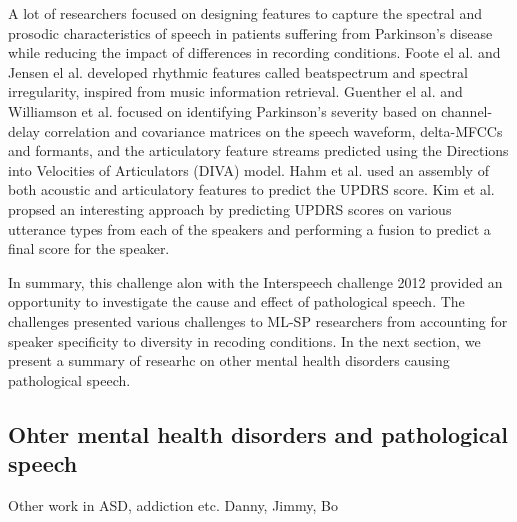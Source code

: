 \documentclass{article}
\begin{document}
A lot of researchers focused on designing features to capture the spectral and prosodic characteristics of speech in patients suffering from Parkinson's disease while reducing the impact of differences in recording conditions.
Foote el al. \cite{foote2002audio} and Jensen el al. \cite{jensen1999timbre} developed rhythmic features called beatspectrum and spectral irregularity, inspired from music information retrieval.
Guenther el al. \cite{guenther2006neural} and Williamson et al. \cite{williamson2015segment} focused on identifying Parkinson's severity based on channel-delay correlation and covariance matrices on the speech waveform, delta-MFCCs and formants, and the articulatory feature streams predicted using the Directions into Velocities of Articulators (DIVA) model.
Hahm et al. \cite{hahm2015parkinson} used an assembly of both acoustic and articulatory features to predict the UPDRS score.
Kim et al. \cite{kim2015automatic} propsed an interesting approach by predicting UPDRS scores on various utterance types from each of the speakers and performing a fusion to predict a final score for the speaker.

In summary, this challenge alon with the Interspeech challenge 2012 provided an opportunity to investigate the cause and effect of pathological speech.
The challenges presented various challenges to ML-SP researchers from accounting for speaker specificity to diversity in recoding conditions.
In the next section, we present a summary of researhc on other mental health disorders causing pathological speech.

\subsection{ Ohter mental health disorders and pathological speech}

Other work in ASD, addiction etc. 
Danny, Jimmy, Bo
\vfill\pagebreak



\end{document}
